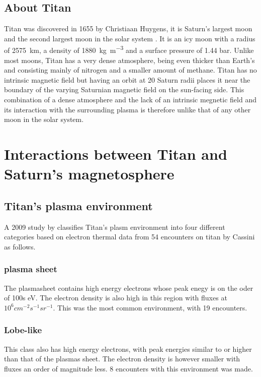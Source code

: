 \documentclass[12pt, parskip=full*, abstract]{scrartcl}
\begin{document}
\subsection{About Titan}
Titan was discovered in 1655 by Christiaan Huygens, it is Saturn's largest moon and the second largest moon in the solar system \parencite{fundamental-planetary-science}. It is an icy moon with a radius of \SI{2575}{\kilo\metre}, a density of \SI{1880}{\kilogram\per\metre^3} and a surface pressure of 1.44 bar. Unlike most moons, Titan has a very dense atmosphere, being even thicker than Earth's and consisting mainly of nitrogen and a smaller amount of methane. Titan has no intrinsic magnetic field but having an orbit at 20 Saturn radii places it near the boundary of the varying Saturnian magnetic field on the sun-facing side. This combination of a dense atmosphere and the lack of an intrinsic megnetic field and its interaction with the surrounding plasma is therefore unlike that of any other moon in the solar system. 


\section{Interactions between Titan and Saturn's magnetosphere}


\subsection{Titan's plasma environment}
A 2009 study by \textcite{Rymer-class} classifies Titan's plasm environment into four different categories based on electron thermal data from 54 encounters on titan by Cassini as follows. 

\subsubsection{plasma sheet}
The plasmasheet contains high energy electrons whose peak enegy is on the oder of 100s eV. The electron density is also high in this region with fluxes at $10^6cm^{-2}s^{-1}sr^{-1}$. This was the most common environment, with 19 encounters. \parencite{Rymer-class}

\subsubsection{Lobe-like}
This class also has high energy electrons, with peak energies similar to or higher than that of the plasmas sheet. The electron density is however smaller with fluxes an order of magnitude less. 8 encounters with this environment was made.\parencite{Rymer-class}
\end{document}
